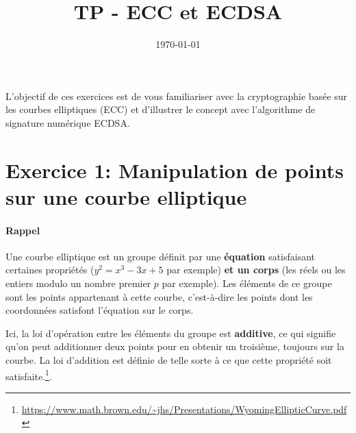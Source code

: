\documentclass[french,a4paper,11pt]{exam}
\title{\textbf{TP - ECC et ECDSA}}
\date{\today}
\begin{document}
\maketitle

L'objectif de ces exercices est de vous familiariser avec la cryptographie basée sur
les courbes elliptiques (ECC) et d'illustrer le concept avec l'algorithme de signature
numérique ECDSA. 



\begin{center}
\end{center}


\section*{Exercice 1: Manipulation de points sur une courbe elliptique}

\paragraph{Rappel} Une courbe elliptique est un groupe définit par une
\textbf{équation} satisfaisant certaines propriétés ($y^2 = x^3 - 3x + 5$ par
exemple) \textbf{et un corps} (les réels ou les entiers modulo un nombre premier
$p$ par exemple). Les éléments de ce groupe sont les points appartenant à cette
courbe, c'est-à-dire les points dont les coordonnées satisfont l'équation sur le
corps.

Ici, la loi d'opération entre les éléments du groupe est \textbf{additive}, ce
qui signifie qu'on peut additionner deux points pour en obtenir un troisième,
toujours sur la courbe. La loi d'addition est définie de telle sorte à ce que
cette propriété soit
satisfaite.\footnote{\url{https://www.math.brown.edu/~jhs/Presentations/WyomingEllipticCurve.pdf}}.
\end{document}
